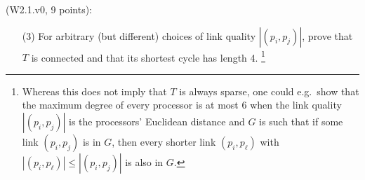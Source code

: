 \begin{Exc}{(W2.1.v0, 9 points):}
\begin{enumerate}
\item[(3)] For arbitrary (but different) choices of link quality
$|(p_i,p_j)|$, prove that $T$ is connected and that its shortest
cycle has length 4.
\footnote{Whereas this does not imply that $T$ is always sparse,
one could e.g.\ show that the maximum degree of every processor is at
most 6 when the link quality $|(p_i,p_j)|$ is the processors' Euclidean
distance and $G$ is such that if some link $(p_i,p_j)$ is
in $G$, then every shorter link $(p_i,p_\ell)$ with $|(p_i,p_\ell)|
\leq |(p_i,p_j)|$ is also in $G$.}
\end{enumerate}
\end{Exc}
